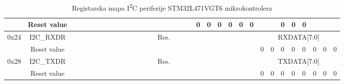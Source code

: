 \begin{table}[H]
{\begin{tabular}{|c|c|c|l|l|l|l|l|l|l|l|l|l|l|l|l|l|l|l|l|l|l|l|l|l|l|l|l|l|l|l|l|l|l|}
		\cline{2-34}
		& Reset value & & & & & & & & & & & & & & & & & & & 0 & 0 & 0 & 0 & 0 & 0 & & & 0 & 0 & 0 & & & \\
		\hline
		\multirow{2}{*}{0x24} & I2C\_RXDR & \multicolumn{24}{c|}{Res.} & \multicolumn{8}{c|}{RXDATA[7:0]} \\
		\cline{2-34}
		& Reset value & & & & & & & & & & & & & & & & & & & & & & & & & 0 & 0 & 0 & 0 & 0 & 0 & 0 & 0 \\
		\hline
		\multirow{2}{*}{0x28} & I2C\_TXDR & \multicolumn{24}{c|}{Res.} & \multicolumn{8}{c|}{TXDATA[7:0]} \\
		\cline{2-34}
		& Reset value & & & & & & & & & & & & & & & & & & & & & & & & & 0 & 0 & 0 & 0 & 0 & 0 & 0 & 0 \\
		\hline
	\end{tabular}%
	}
	\caption{Registarska mapa I\textsuperscript{2}C periferije STM32L471VGT6 mikrokontrolera \cite{l471_manual}}
	\label{Tab:l471_i2c_register_map}
\end{table}

